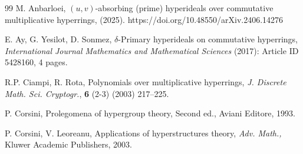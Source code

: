 \documentclass[preprint,review,10pt]{amsart}
\theoremstyle{definition}
\theoremstyle{remark}
\numberwithin{equation}{section}
\begin{document}
\begin{thebibliography}{99}
M. Anbarloei, $(u,v)$-absorbing (prime) hyperideals over commutative multiplicative hyperrings, (2025). 
https://doi.org/10.48550/arXiv.2406.14276












E. Ay, G. Yesilot, D. Sonmez, $\delta$-Primary hyperideals on commutative hyperrings, {\it International Journal Mathematics and Mathematical Sciences}  (2017): Article ID 5428160, 4 pages.






R.P. Ciampi, R. Rota, Polynomials over multiplicative hyperrings, {\it J.
Discrete Math. Sci. Cryptogr.}, {\bf 6} (2-3) (2003) 217–225.



P. Corsini, Prolegomena of hypergroup theory, Second ed., Aviani Editore, 1993.

P. Corsini, V. Leoreanu, Applications of hyperstructures theory, {\it Adv. Math.,} Kluwer Academic Publishers, 2003.



\end{thebibliography}
\end{document}
